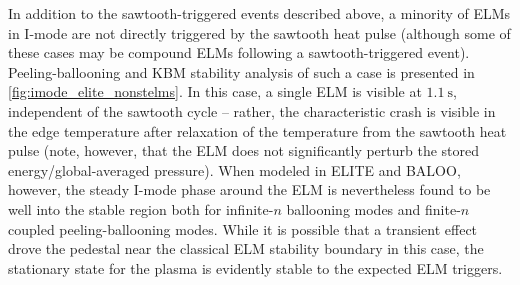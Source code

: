 In addition to the sawtooth-triggered events described above, a minority of ELMs in I-mode are not directly triggered by the sawtooth heat pulse (although some of these cases may be compound ELMs following a sawtooth-triggered event).  Peeling-ballooning and KBM stability analysis of such a case is presented in \cref{fig:imode_elite_nonstelms}.  In this case, a single ELM is visible at $\SI{1.1}{\second}$, independent of the sawtooth cycle -- rather, the characteristic crash is visible in the edge temperature after relaxation of the temperature from the sawtooth heat pulse (note, however, that the ELM does not significantly perturb the stored energy/global-averaged pressure).  When modeled in ELITE and BALOO, however, the steady I-mode phase around the ELM is nevertheless found to be well into the stable region both for infinite-$n$ ballooning modes and finite-$n$ coupled peeling-ballooning modes.  While it is possible that a transient effect drove the pedestal near the classical ELM stability boundary in this case, the stationary state for the plasma is evidently stable to the expected ELM triggers.

